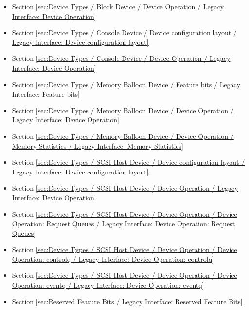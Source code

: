 \begin{itemize}
\item Section \ref{sec:Device Types / Block Device / Device Operation / Legacy Interface: Device Operation}
\item Section \ref{sec:Device Types / Console Device / Device configuration layout / Legacy Interface: Device configuration layout}
\item Section \ref{sec:Device Types / Console Device / Device Operation / Legacy Interface: Device Operation}
\item Section \ref{sec:Device Types / Memory Balloon Device / Feature bits / Legacy Interface: Feature bits}
\item Section \ref{sec:Device Types / Memory Balloon Device / Device Operation / Legacy Interface: Device Operation}
\item Section \ref{sec:Device Types / Memory Balloon Device / Device Operation / Memory Statistics / Legacy Interface: Memory Statistics}
\item Section \ref{sec:Device Types / SCSI Host Device / Device configuration layout / Legacy Interface: Device configuration layout}
\item Section \ref{sec:Device Types / SCSI Host Device / Device Operation / Legacy Interface: Device Operation}
\item Section \ref{sec:Device Types / SCSI Host Device / Device Operation / Device Operation: Request Queues / Legacy Interface: Device Operation: Request Queues}
\item Section \ref{sec:Device Types / SCSI Host Device / Device Operation / Device Operation: controlq / Legacy Interface: Device Operation: controlq}
\item Section \ref{sec:Device Types / SCSI Host Device / Device Operation / Device Operation: eventq / Legacy Interface: Device Operation: eventq}
\item Section \ref{sec:Reserved Feature Bits / Legacy Interface: Reserved Feature Bits}
\end{itemize}
